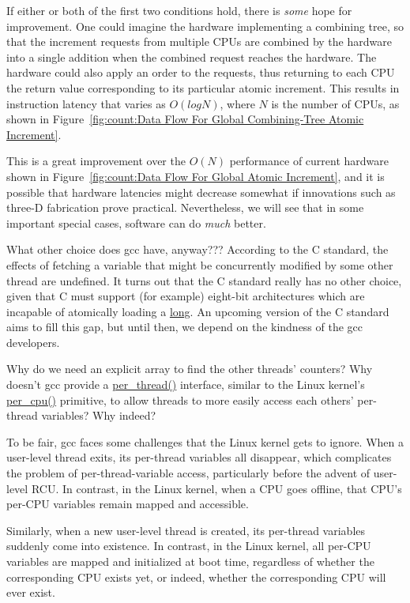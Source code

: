	If either or both of the first two conditions hold, there is
	\emph{some} hope for improvement.
	One could imagine the hardware implementing a combining tree,
	so that the increment requests from multiple CPUs are combined
	by the hardware into a single addition when the combined request
	reaches the hardware.
	The hardware could also apply an order to the requests, thus
	returning to each CPU the return value corresponding to its
	particular atomic increment.
	This results in instruction latency that varies as $O(log N)$,
	where $N$ is the number of CPUs, as shown in
	Figure~\ref{fig:count:Data Flow For Global Combining-Tree Atomic Increment}.

	This is a great improvement over the $O(N)$ performance
	of current hardware shown in
	Figure~\ref{fig:count:Data Flow For Global Atomic Increment},
	and it is possible that hardware latencies might decrease
	somewhat if innovations such as three-D fabrication prove
	practical.
	Nevertheless, we will see that in some important special cases,
	software can do \emph{much} better.

\QuickQ{}
	What other choice does gcc have, anyway???
\QuickA{}
	According to the C standard, the effects of fetching a variable
	that might be concurrently modified by some other thread are
	undefined.
	It turns out that the C standard really has no other choice,
	given that C must support (for example) eight-bit architectures
	which are incapable of atomically loading a \url{long}.
	An upcoming version of the C standard aims to fill this gap,
	but until then, we depend on the kindness of the gcc developers.

\QuickQ{}
	Why do we need an explicit array to find the other threads'
	counters?
	Why doesn't gcc provide a \url{per_thread()} interface, similar
	to the Linux kernel's \url{per_cpu()} primitive, to allow
	threads to more easily access each others' per-thread variables?
\QuickA{}
	Why indeed?

	To be fair, gcc faces some challenges that the Linux kernel
	gets to ignore.
	When a user-level thread exits, its per-thread variables all
	disappear, which complicates the problem of per-thread-variable
	access, particularly before the advent of user-level RCU.
	In contrast, in the Linux kernel, when a CPU goes offline,
	that CPU's per-CPU variables remain mapped and accessible.

	Similarly, when a new user-level thread is created, its
	per-thread variables suddenly come into existence.
	In contrast, in the Linux kernel, all per-CPU variables are
	mapped and initialized at boot time, regardless of whether
	the corresponding CPU exists yet, or indeed, whether the
	corresponding CPU will ever exist.

